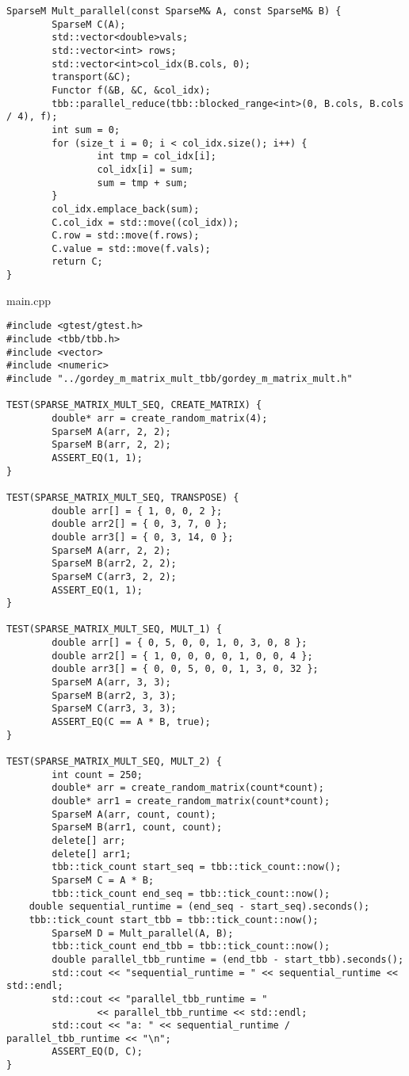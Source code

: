 \documentclass{report}
\begin{document}
\begin{lstlisting}
SparseM Mult_parallel(const SparseM& A, const SparseM& B) {
        SparseM C(A);
        std::vector<double>vals;
        std::vector<int> rows;
        std::vector<int>col_idx(B.cols, 0);
        transport(&C);
        Functor f(&B, &C, &col_idx);
        tbb::parallel_reduce(tbb::blocked_range<int>(0, B.cols, B.cols / 4), f);
        int sum = 0;
        for (size_t i = 0; i < col_idx.size(); i++) {
                int tmp = col_idx[i];
                col_idx[i] = sum;
                sum = tmp + sum;
        }
        col_idx.emplace_back(sum);
        C.col_idx = std::move((col_idx));
        C.row = std::move(f.rows);
        C.value = std::move(f.vals);
        return C;
}
\end{lstlisting}
main.cpp
\begin{lstlisting}
#include <gtest/gtest.h>
#include <tbb/tbb.h>
#include <vector>
#include <numeric>
#include "../gordey_m_matrix_mult_tbb/gordey_m_matrix_mult.h"

TEST(SPARSE_MATRIX_MULT_SEQ, CREATE_MATRIX) {
        double* arr = create_random_matrix(4);
        SparseM A(arr, 2, 2);
        SparseM B(arr, 2, 2);
        ASSERT_EQ(1, 1);
}

TEST(SPARSE_MATRIX_MULT_SEQ, TRANSPOSE) {
        double arr[] = { 1, 0, 0, 2 };
        double arr2[] = { 0, 3, 7, 0 };
        double arr3[] = { 0, 3, 14, 0 };
        SparseM A(arr, 2, 2);
        SparseM B(arr2, 2, 2);
        SparseM C(arr3, 2, 2);
        ASSERT_EQ(1, 1);
}

TEST(SPARSE_MATRIX_MULT_SEQ, MULT_1) {
        double arr[] = { 0, 5, 0, 0, 1, 0, 3, 0, 8 };
        double arr2[] = { 1, 0, 0, 0, 0, 1, 0, 0, 4 };
        double arr3[] = { 0, 0, 5, 0, 0, 1, 3, 0, 32 };
        SparseM A(arr, 3, 3);
        SparseM B(arr2, 3, 3);
        SparseM C(arr3, 3, 3);
        ASSERT_EQ(C == A * B, true);
}

TEST(SPARSE_MATRIX_MULT_SEQ, MULT_2) {
        int count = 250;
        double* arr = create_random_matrix(count*count);
        double* arr1 = create_random_matrix(count*count);
        SparseM A(arr, count, count);
        SparseM B(arr1, count, count);
        delete[] arr;
        delete[] arr1;
        tbb::tick_count start_seq = tbb::tick_count::now();
        SparseM C = A * B;
        tbb::tick_count end_seq = tbb::tick_count::now();
    double sequential_runtime = (end_seq - start_seq).seconds();
    tbb::tick_count start_tbb = tbb::tick_count::now();
        SparseM D = Mult_parallel(A, B);
        tbb::tick_count end_tbb = tbb::tick_count::now();
        double parallel_tbb_runtime = (end_tbb - start_tbb).seconds();
        std::cout << "sequential_runtime = " << sequential_runtime << std::endl;
        std::cout << "parallel_tbb_runtime = "
                << parallel_tbb_runtime << std::endl;
        std::cout << "a: " << sequential_runtime / parallel_tbb_runtime << "\n";
        ASSERT_EQ(D, C);
}


\end{lstlisting}
\end{document}
